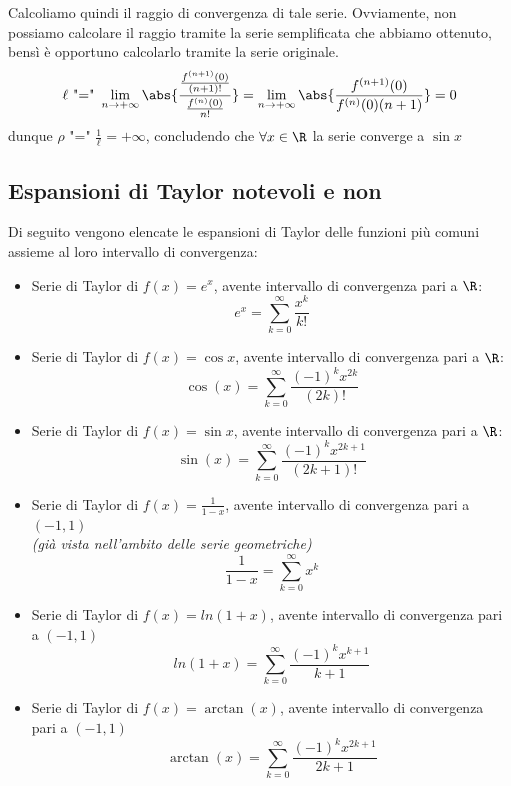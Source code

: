 \documentclass[a4paper, 12pt]{report}
\begin{document}
{        Calcoliamo quindi il raggio di convergenza di tale serie. Ovviamente, non possiamo calcolare il raggio tramite la serie semplificata che abbiamo ottenuto, bensì è opportuno calcolarlo tramite la serie originale.
        \[\ell \text{ "=" } \lim_{n \to +\infty} \abs{\frac{\frac{f^{(n+1)}(0)}{(n+1)!}}{\frac{f^{(n)}(0)}{n!}}} = \lim_{n \to +\infty} \abs{\frac{f^{(n+1)}(0)}{f^{(n)}(0) (n+1)}} = 0\]
        dunque $\rho \text{ "=" } \frac{1}{\ell} = +\infty$, concludendo che $\forall x \in \R$ la serie converge a $\sin x$ 

    }

    \subsection{Espansioni di Taylor notevoli e non}

    Di seguito vengono elencate le espansioni di Taylor delle funzioni più comuni assieme al loro intervallo di convergenza:
    \begin{itemize}
        \item Serie di Taylor di $f(x) = e^x$, avente intervallo di convergenza pari a $\R$:
        \[ e^x =  \sum_{k=0}^{\infty} \frac{x^k}{k!}\]
        
        \item Serie di Taylor di $f(x) = \cos x$, avente intervallo di convergenza pari a $\R$:
        \[ \cos(x) =  \sum_{k=0}^{\infty} \frac{(-1)^k x^{2k}}{(2k)!}\]
        
        \item Serie di Taylor di $f(x) = \sin x$, avente intervallo di convergenza pari a $\R$:
        \[ \sin(x) =  \sum_{k=0}^{\infty} \frac{(-1)^k x^{2k+1}}{(2k+1)!}\]
        
        \item Serie di Taylor di $f(x) = \frac{1}{1-x}$, avente intervallo di convergenza pari a $(-1, 1)$ \\\textit{(già vista nell'ambito delle serie geometriche)}
        \[ \frac{1}{1-x} =  \sum_{k=0}^{\infty} x^k\]
                
        \item Serie di Taylor di $f(x) = ln(1+x)$, avente intervallo di convergenza pari a $(-1, 1)$
        \[ ln(1+x) =  \sum_{k=0}^{\infty} \frac{(-1)^k x^{k+1}}{k+1}\]
        
        \item Serie di Taylor di $f(x) = \arctan(x)$, avente intervallo di convergenza pari a $(-1, 1)$
        \[\arctan(x) =  \sum_{k=0}^{\infty} \frac{(-1)^k x^{2k+1}}{2k+1}\]
    \end{itemize}
\end{document}
